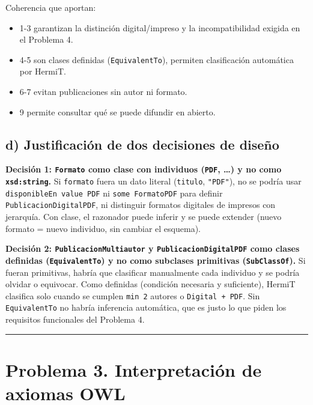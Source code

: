 Coherencia que aportan:

\begin{itemize}
\tightlist
\item
  1-3 garantizan la distinción digital/impreso y la incompatibilidad
  exigida en el Problema 4.
\item
  4-5 son clases definidas (\texttt{EquivalentTo}), permiten
  clasificación automática por HermiT.
\item
  6-7 evitan publicaciones sin autor ni formato.
\item
  9 permite consultar qué se puede difundir en abierto.
\end{itemize}

\subsection{d) Justificación de dos decisiones de
diseño}\label{d-justificaciuxf3n-de-dos-decisiones-de-diseuxf1o}

\textbf{Decisión 1: \texttt{Formato} como clase con individuos
(\texttt{PDF}, \ldots) y no como \texttt{xsd:string}.} Si
\texttt{formato} fuera un dato literal (\texttt{titulo},
\texttt{"PDF"}), no se podría usar \texttt{disponibleEn\ value\ PDF} ni
\texttt{some\ FormatoPDF} para definir \texttt{PublicacionDigitalPDF},
ni distinguir formatos digitales de impresos con jerarquía. Con clase,
el razonador puede inferir y se puede extender (nuevo formato = nuevo
individuo, sin cambiar el esquema).

\textbf{Decisión 2: \texttt{PublicacionMultiautor} y
\texttt{PublicacionDigitalPDF} como clases definidas
(\texttt{EquivalentTo}) y no como subclases primitivas
(\texttt{SubClassOf}).} Si fueran primitivas, habría que clasificar
manualmente cada individuo y se podría olvidar o equivocar. Como
definidas (condición necesaria y suficiente), HermiT clasifica solo
cuando se cumplen \texttt{min\ 2} autores o \texttt{Digital\ +\ PDF}.
Sin \texttt{EquivalentTo} no habría inferencia automática, que es justo
lo que piden los requisitos funcionales del Problema 4.

\begin{center}\rule{0.5\linewidth}{0.5pt}\end{center}

\section{Problema 3. Interpretación de axiomas
OWL}\label{problema-3.-interpretaciuxf3n-de-axiomas-owl}

